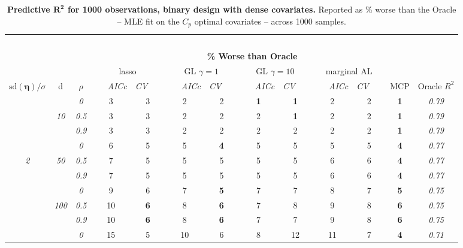 \clearpage
\begin{table}
\vspace{-.2cm}
\footnotesize
\caption{ 
	{\bf  Predictive $\boldsymbol{R^2}$ for 1000 observations, 
	binary design with dense covariates.}
  Reported as  \% worse than the Oracle 
  -- MLE fit on the $C_p$ optimal covariates -- 
  across 1000 samples.}
\begin{center}
\begin{tabular}{ccc|cc|cc|cc|cc|c|c}
\hline &&&\multicolumn{9}{|c|}{~}\\[-1ex]
\multicolumn{3}{c}{~}&\multicolumn{9}{|c|}{\bf \% Worse than Oracle } &   \\[1ex]
& &
& \multicolumn{2}{c}{lasso} 
& \multicolumn{2}{c}{GL $\gamma=1$} 
& \multicolumn{2}{c}{GL $\gamma=10$} 
& \multicolumn{2}{c}{marginal AL} 
& \multicolumn{1}{c|}{~} & \\[-0.5ex]
$\mathrm{sd}(\boldsymbol{\eta})/\sigma$ & {\sf d} & $\rho$ 
& ~~~\scriptsize\it AICc & \multicolumn{1}{c}{\scriptsize\it CV~~~}
& ~~~\scriptsize\it AICc & \multicolumn{1}{c}{\scriptsize\it CV~~~}
& ~~~\scriptsize\it AICc & \multicolumn{1}{c}{\scriptsize\it CV~~~}
& ~~~\scriptsize\it AICc & \multicolumn{1}{c}{\scriptsize\it CV~~~} 
& \multicolumn{1}{c|}{ MCP} & Oracle $R^2$ \\[.5ex]
\hline\rule{0pt}{3ex}
& & \it  0  & 3 & 3 & 2 & 2 & {\bf 1} & {\bf 1} & 2 & 2 & {\bf 1} & \it  0.79 \\
 & \it  10  & \it  0.5  & 3 & 3 & 2 & 2 & 2 & {\bf 1} & 2 & 2 & {\bf 1} & \it  0.79 \\
& & \it  0.9  & 3 & 3 & 2 & 2 & 2 & 2 & 2 & 2 & {\bf 1} & \it  0.79 \\[1ex]
\cline{2-3}\rule{0pt}{3ex}
& & \it  0  & 6 & 5 & 5 & {\bf 4} & 5 & 5 & 5 & 5 & {\bf 4} & \it  0.77 \\
\it  2  & \it  50  & \it  0.5  & 7 & 5 & 5 & 5 & 5 & 5 & 6 & 6 & {\bf 4} & \it  0.77 \\
& & \it  0.9  & 7 & 5 & 5 & 5 & 5 & 5 & 6 & 6 & {\bf 4} & \it  0.77 \\[1ex]
\cline{2-3}\rule{0pt}{3ex}
& & \it  0  & 9 & 6 & 7 & {\bf 5} & 7 & 7 & 8 & 7 & {\bf 5} & \it  0.75 \\
 & \it  100  & \it  0.5  & 10 & {\bf 6} & 8 & {\bf 6} & 7 & 8 & 9 & 8 & {\bf 6} & \it  0.75 \\
& & \it  0.9  & 10 & {\bf 6} & 8 & {\bf 6} & 7 & 7 & 9 & 8 & {\bf 6} & \it  0.75 \\[1ex]
\cline{2-3}\rule{0pt}{3ex}
& & \it  0  & 15 & 5 & 10 & 6 & 8 & 12 & 11 & 7 & {\bf 4} & \it  0.71 \\

\end{tabular}
\end{center}
\end{table}
